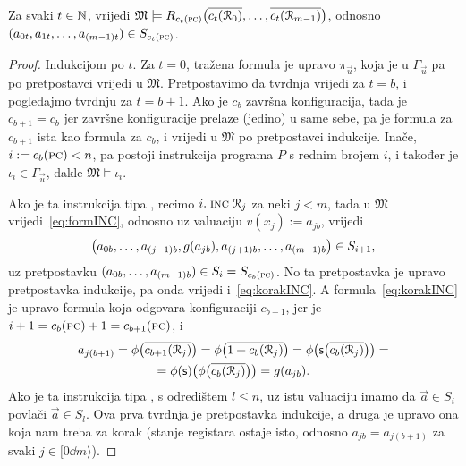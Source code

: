 \begin{lema}[{name=[izračunavanje čuva istinitost formula pojedinih konfiguracija]}]\label{lm:formcomputesteps}
Za svaki $t\in{\mathbb N}$, vrijedi $\mathfrak M\models R_{c_t(\textsc{pc})}\bigl(\overline{c_t(\mathcal R_{0})},\dotsc,\overline{c_t(\mathcal R_{m-1})}\bigr)$, odnosno $(a_{0t},a_{1t},\dotsc,a_{(m-1)t})\in S_{c_t(\textsc{pc})}$.
\end{lema}
\begin{proof}
Indukcijom po $t$. Za $t=0$, tražena formula je upravo $\pi_{\vec u}$, koja je u $\Gamma_{\vec u}$ pa po pretpostavci vrijedi u $\mathfrak M$. Pretpostavimo da tvrdnja vrijedi za $t=b$, i pogledajmo tvrdnju za $t=b+1$. Ako je $c_b$ završna konfiguracija, tada je $c_{b+1}=c_b$ jer završne konfiguracije prelaze (jedino) u same sebe, pa je formula za $c_{b+1}$ ista kao formula za $c_b$, i vrijedi u $\mathfrak M$ po pretpostavci indukcije. Inače, $i:=c_b(\textsc{pc})<n$, pa postoji instrukcija programa $P$ s rednim brojem $i$, i također je $\iota_i\in\Gamma_{\vec u}$, dakle $\mathfrak M\models\iota_i$.

Ako je ta instrukcija tipa \inc, recimo $i.\;\textsc{inc}\;\mathcal R_{j}$ za neki $j<m$, tada u $\mathfrak M$ vrijedi~\eqref{eq:formINC}, odnosno uz valuaciju $v(x_j):=a_{jb}$, vrijedi
\begin{equation}
\label{eq:korakINC}
    \bigl(a_{0b},\dotsc,a_{(j-1)b},g(a_{jb}),a_{(j+1)b},\dotsc,a_{(m-1)b}\bigr)\in S_{i+1}\text,
\end{equation} uz pretpostavku $(a_{0b},\dotsc,a_{(m-1)b})\in S_i=S_{c_b(\textsc{pc})}$. No ta pretpostavka je upravo pretpostavka indukcije, pa onda vrijedi i~\eqref{eq:korakINC}. A formula~\eqref{eq:korakINC} je upravo formula koja odgovara konfiguraciji $c_{b+1}$, jer je $i+1=c_b(\textsc{pc})+1=c_{b+1}(\textsc{pc})$, i
\begin{multline}
a_{j(b+1)}=\phi\bigl(\overline{c_{b+1}(\mathcal R_{j})}\bigr)=\phi\bigl(\overline{1+c_b(\mathcal R_{j})}\bigr)=\phi\bigl(\mathsf s\bigl(\overline{c_b(\mathcal R_{j})}\bigr)\bigr)=\\
=\phi(\mathsf s)\bigl(\phi\bigl(\overline{c_b(\mathcal R_{j})}\bigr)\bigr)=g(a_{jb})\text.
\end{multline}
Ako je ta instrukcija tipa \goto, s odredištem $l\le n$, uz istu valuaciju imamo da $\vec a\in S_i$ povlači $\vec a\in S_l$. Ova prva tvrdnja je pretpostavka indukcije, a druga je upravo ona koja nam treba za korak (stanje registara ostaje isto, odnosno $a_{jb}=a_{j(b+1)}$ za svaki $j\in[0\dd m\rangle$).


\end{proof}
